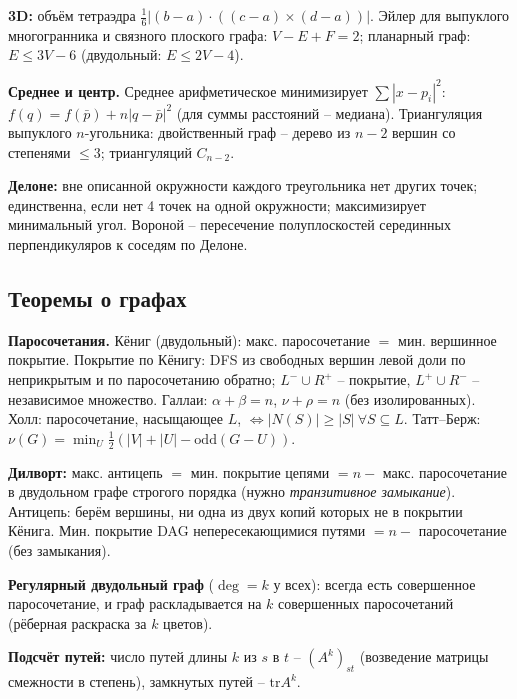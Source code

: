 \par \textbf{3D:} объём тетраэдра $\frac16|(b{-}a)\cdot((c{-}a)\times(d{-}a))|$. Эйлер для выпуклого многогранника и связного плоского графа: $V-E+F=2$; планарный граф: $E\le3V-6$ (двудольный: $E\le2V-4$).
\par \textbf{Среднее и центр.} Среднее арифметическое минимизирует $\sum|x-p_i|^2$: $f(q)=f(\bar p)+n|q-\bar p|^2$ (для суммы расстояний -- медиана). Триангуляция выпуклого $n$-угольника: двойственный граф -- дерево из $n{-}2$ вершин со степенями $\le3$; триангуляций $C_{n-2}$.
\par \textbf{Делоне:} вне описанной окружности каждого треугольника нет других точек; единственна, если нет 4 точек на одной окружности; максимизирует минимальный угол. Вороной -- пересечение полуплоскостей серединных перпендикуляров к соседям по Делоне.
\subsection{Теоремы о графах}
\textbf{Паросочетания.} Кёниг (двудольный): макс. паросочетание $=$ мин. вершинное покрытие. Покрытие по Кёнигу: DFS из свободных вершин левой доли по неприкрытым и по паросочетанию обратно; $L^-\cup R^+$ -- покрытие, $L^+\cup R^-$ -- независимое множество. Галлаи: $\alpha+\beta=n$, $\nu+\rho=n$ (без изолированных). Холл: паросочетание, насыщающее $L$, $\iff|N(S)|\ge|S|\ \forall S\subseteq L$. Татт--Берж: $\nu(G)=\min_{U}\frac12(|V|+|U|-\mathrm{odd}(G-U))$.
\par \textbf{Дилворт:} макс. антицепь $=$ мин. покрытие цепями $=n-$ макс. паросочетание в двудольном графе строгого порядка (нужно \emph{транзитивное замыкание}). Антицепь: берём вершины, ни одна из двух копий которых не в покрытии Кёнига. Мин. покрытие DAG непересекающимися путями $=n-$ паросочетание (без замыкания).
\par \textbf{Регулярный двудольный граф} ($\deg=k$ у всех): всегда есть совершенное паросочетание, и граф раскладывается на $k$ совершенных паросочетаний (рёберная раскраска за $k$ цветов).
\par \textbf{Подсчёт путей:} число путей длины $k$ из $s$ в $t$ -- $(A^k)_{st}$ (возведение матрицы смежности в степень), замкнутых путей -- $\mathrm{tr}A^k$.

